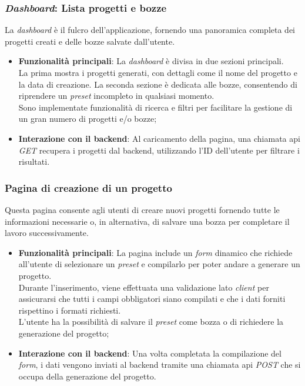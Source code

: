 \subsubsection{\textit{Dashboard}: Lista progetti e bozze}
La \textit{dashboard} è il fulcro dell'applicazione, fornendo una panoramica completa dei progetti creati e delle bozze salvate dall'utente.
\begin{itemize}
    \item \textbf{Funzionalità principali}: La \textit{dashboard} è divisa in due sezioni principali.\\
    La prima mostra i progetti generati, con dettagli come il nome del progetto e la data di creazione. La seconda sezione è dedicata alle bozze, consentendo di riprendere un \textit{preset} incompleto in qualsiasi momento.\\
    Sono implementate funzionalità di ricerca e filtri per facilitare la gestione di un gran numero di progetti e/o bozze;
    \item \textbf{Interazione con il \gls{backend}}: Al caricamento della pagina, una chiamata \gls{api} \textit{GET} recupera i progetti dal \gls{backend}, utilizzando l'ID dell'utente per filtrare i risultati.
\end{itemize}

\subsubsection{Pagina di creazione di un progetto}
Questa pagina consente agli utenti di creare nuovi progetti fornendo tutte le informazioni necessarie o, in alternativa, di salvare una bozza per completare il lavoro successivamente. 
\begin{itemize}
    \item \textbf{Funzionalità principali}: La pagina include un \textit{form} dinamico che richiede all'utente di selezionare un \textit{preset} e compilarlo per poter andare a generare un progetto.\\ 
    Durante l'inserimento, viene effettuata una validazione lato \textit{client} per assicurarsi che tutti i campi obbligatori siano compilati e che i dati forniti rispettino i formati richiesti. \\
    L'utente ha la possibilità di salvare il \textit{preset} come bozza o di richiedere la generazione del progetto;
    \item \textbf{Interazione con il \gls{backend}}: Una volta completata la compilazione del \textit{form}, i dati vengono inviati al \gls{backend} tramite una chiamata \gls{api} \textit{POST} che si occupa della generazione del progetto.\\
\end{itemize}

